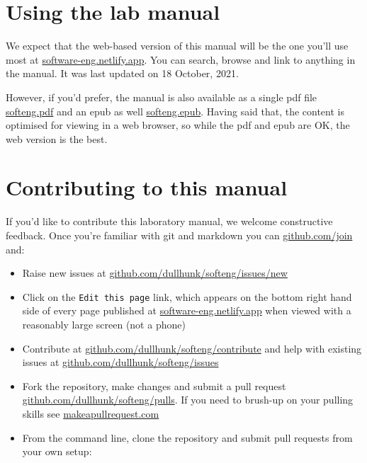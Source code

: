 \documentclass[
]{book}
\providecommand{\tightlist}{%
  \setlength{\itemsep}{0pt}\setlength{\parskip}{0pt}}
\begin{document}
\hypertarget{usingit}{%
\section{Using the lab manual}\label{usingit}}

We expect that the web-based version of this manual will be the one you'll use most at \href{https://software-eng.netlify.app/}{software-eng.netlify.app}. You can search, browse and link to anything in the manual. It was last updated on 18 October, 2021.

However, if you'd prefer, the manual is also available as a single pdf file \href{https://software-eng.netlify.app/softeng.pdf}{softeng.pdf} and an epub as well \href{https://software-eng.netlify.app/softeng.epub}{softeng.epub}. Having said that, the content is optimised for viewing in a web browser, so while the pdf and epub are OK, the web version is the best.

\hypertarget{contributing}{%
\section{Contributing to this manual}\label{contributing}}

If you'd like to contribute this laboratory manual, we welcome constructive feedback. Once you're familiar with git and markdown you can \href{https://github.com/join}{github.com/join} and:

\begin{itemize}
\tightlist
\item
  Raise new issues at \href{https://github.com/dullhunk/softeng/issues/new}{github.com/dullhunk/softeng/issues/new}
\item
  Click on the \texttt{Edit\ this\ page} link, which appears on the bottom right hand side of every page published at \href{https://software-eng.netlify.app}{software-eng.netlify.app} when viewed with a reasonably large screen (not a phone)
\item
  Contribute at \href{https://github.com/dullhunk/softeng/contribute}{github.com/dullhunk/softeng/contribute} and help with existing issues at \href{https://github.com/dullhunk/softeng/issues}{github.com/dullhunk/softeng/issues}
\item
  Fork the repository, make changes and submit a pull request \href{https://github.com/dullhunk/softeng/pulls}{github.com/dullhunk/softeng/pulls}. If you need to brush-up on your pulling skills see \href{http://makeapullrequest.com/}{makeapullrequest.com}
\item
  From the command line, clone the repository and submit pull requests from your own setup:
\end{itemize}
\end{document}
